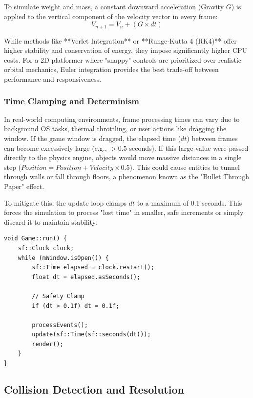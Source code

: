 \documentclass[10pt, a4paper]{article}
\begin{document}
To simulate weight and mass, a constant downward acceleration (Gravity $G$) is applied to the vertical component of the velocity vector in every frame:
\begin{equation}
V_{n+1} = V_{n} + (G \times dt)
\end{equation}

While methods like **Verlet Integration** or **Runge-Kutta 4 (RK4)** offer higher stability and conservation of energy, they impose significantly higher CPU costs. For a 2D platformer where "snappy" controls are prioritized over realistic orbital mechanics, Euler integration provides the best trade-off between performance and responsiveness.

\subsubsection{Time Clamping and Determinism}
In real-world computing environments, frame processing times can vary due to background OS tasks, thermal throttling, or user actions like dragging the window. If the game window is dragged, the elapsed time ($dt$) between frames can become excessively large (e.g., $> 0.5$ seconds). If this large value were passed directly to the physics engine, objects would move massive distances in a single step ($Position = Position + Velocity \times 0.5$). This could cause entities to tunnel through walls or fall through floors, a phenomenon known as the "Bullet Through Paper" effect. 

To mitigate this, the update loop clamps $dt$ to a maximum of 0.1 seconds. This forces the simulation to process "lost time" in smaller, safe increments or simply discard it to maintain stability.

\begin{lstlisting}[caption={Delta Time Clamping Implementation}]
void Game::run() {
    sf::Clock clock;
    while (mWindow.isOpen()) {
        sf::Time elapsed = clock.restart();
        float dt = elapsed.asSeconds();

        // Safety Clamp
        if (dt > 0.1f) dt = 0.1f;

        processEvents();
        update(sf::Time(sf::seconds(dt)));
        render();
    }
}
\end{lstlisting}

\subsection{Collision Detection and Resolution}
\end{document}
